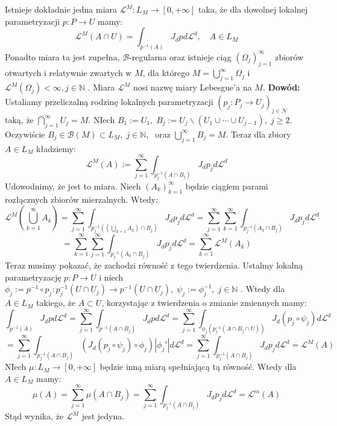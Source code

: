 \begin{tw}
	Istnieje dokładnie jedna miara $\mathcal{L}^M: L_M \rightarrow [0, +\infty]$ taka, że dla dowolnej lokalnej parametryzacji $p: P \rightarrow U$ mamy: $$
		\mathcal{L}^M(A \cap U) = \int_{p^{-1}(A)} J_dp d \mathcal{L}^d, \quad A \in L_M
	$$
	Ponadto miara ta jest zupełna, $\mathcal{B}$-regularna oraz istnieje ciąg $(\Omega_j)_{j=1}^{\infty}$ zbiorów otwartych i relatywnie zwartych w $M$, dla którego $M = \bigcup_{j=1}^{\infty} \Omega_j$ i $\mathcal{L}^M(\Omega_j) < \infty, j \in \mathbb{N}$ . Miara $\mathcal{L}^M$ nosi nazwę miary Lebesgue'a na $M$.
	\newline
	\textbf{Dowód:}\newline
	Ustaliamy przeliczalną rodzinę lokalnych parametryzacji $(p_j: P_j \rightarrow U_j)_{j \in \mathcal{N}}$ taką, że $\bigcap_{j=1}^{\infty} U_j = M$. NIech $B_1:= U_1, \; B_j := U_j \backslash (U_1 \cup \cdots \cup U_{j-1}), \; j \geq 2$. Oczywiście $B_j \in \mathcal{B}(M) \subset L_M, \; j \in \mathbb{N},\;$ oraz $\bigcup_{j=1}^{\infty} B_j = M$. Teraz dla zbiory $A \in L_M$ kładziemy: $$
		\mathcal{L}^M(A) := \sum_{j=1}^{\infty} \int_{p_j^{-1}(A \cap B_j)} J_dp_j d\mathcal{L}^d
	$$
	Udowodnimy, że jest to miara. Niech $(A_k)_{k=1}^{\infty}$ będzie ciągiem parami rozłącznych zbiorów mierzalnych. Wtedy: 
	$$
		\mathcal{L}^M(\bigcup_{k=1}^{\infty} A_k) 
		= \sum^{\infty}_{j=1} \int_{p_j^{-1}((\bigcup_{k=1} A_k) \cap B_j)} J_dp_jd\mathcal{L}^d
		= \sum_{j=1}^{\infty} \sum_{k=1}^{\infty} \int_{p_j^{-1}(A_k \cap B_j)} J_dp_j d \mathcal{L}^d
	$$
	$$
		= \sum_{k=1}^{\infty} \sum_{j=1}^{\infty} \int_{p_j^{-1}(A_k \cap B_j)} J_dp_j d \mathcal{L}^d
		= \sum_{k=1}^{\infty} \mathcal{L}^M(A_k)
	$$
	Teraz musimy pokazać, że zachodzi równość z tego twierdzenia. Ustalmy lokalną parametryzację $p: P \rightarrow U$  i niech $\phi_j := p^{-1} \circ p_j:p^{-1}_j(U \cap U_j) \rightarrow p^{-1}(U \cap U_j), \; \psi_j := \phi_j^{-1}, \; j \in \mathbb{N}$ . Wtedy dla $A \in L_M$ takiego, że $A \subset U$, korzystając z twierdzenia o zmianie zmiennych mamy: $$
		\int_{p^{-1}(A)} J_dp d \mathcal{L}^d 
		= \sum_{j=1}^{\infty} \int_{p^{-1}(A \cap B_j)} J_dp d \mathcal{L}^d
		= \sum_{j=1}^{\infty} \int_{\phi_j(p_j^{-1}(A \cap B_j \cap U))} J_d(p_j \circ \psi_j) d \mathcal{L}^d
	$$
	$$
		= \sum_{j=1}^{\infty} \int_{p_j^{-1}(A \cap B_j)} (J_d(p_j \circ \psi_j) \circ \phi_j) |\phi_j'| d \mathcal{L}^d
		= \sum_{j=1}^{\infty} \int_{p_j^{-1}(A \cap B_j)} J_dp_j d \mathcal{L}^d = \mathcal{L}^M(A)
	$$
	NIech $\mu: L_M \rightarrow [0, +\infty]$ będzie inną miarą spełniającą tą równość. Wtedy dla $A \in L_M$ mamy: $$
		\mu(A) = \sum_{j=1}^{\infty} \mu(A \cap B_j) = \sum_{j=1}^{\infty} \int_{p_j^{-1}(A \cap B_j)} J_dp_j d \mathcal{L}^d = \mathcal{L}^m(A)
	$$
	Stąd wynika, że $\mathcal{L}^M$ jest jedyna.
\end{tw}